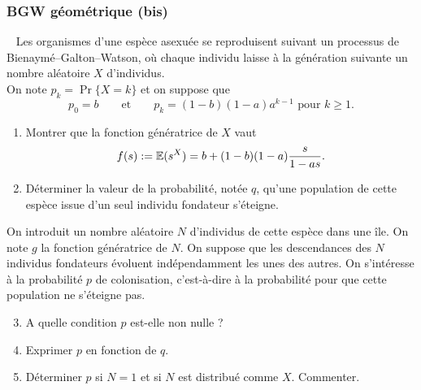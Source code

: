 \subsubsection{BGW géométrique (bis)}

\begin{exercise}[Probabilités] ~ \label{exam:Proba}
  Les organismes d’une espèce asexuée se reproduisent suivant un processus de Bienaymé–Galton–Watson, où chaque individu laisse à la génération suivante un nombre aléatoire $X$ d’individus. \\
  On note $p_k = \Pr\{X = k\}$ et on suppose que 
  $$
  p_0 = b
  \qquad \text{et} \qquad 
  p_k = (1 - b) (1 - a) a^{k-1} \text{ pour } k \geq 1.
  $$
  \begin{enumerate}
    \item Montrer que la fonction génératrice de $X$ vaut
    $$
    f(s) := \operatorname{\mathbb{E}}(s^X) = b + (1-b)(1-a) \frac{s}{1 - as}.
    $$
    \item Déterminer la valeur de la probabilité, notée $q$, qu'une population de cette espèce issue d’un seul individu fondateur s'éteigne.
  \end{enumerate}
  On introduit un nombre aléatoire $N$ d'individus de cette espèce dans une île. On note $g$ la fonction génératrice de $N$. On suppose que les descendances des $N$ individus fondateurs évoluent indépendamment les unes des autres. On s'intéresse à la probabilité $p$ de colonisation, c'est-à-dire à la probabilité pour que cette population ne s'éteigne pas.
  \begin{enumerate}
    \setcounter{enumi}{2}
    \item A quelle condition $p$ est-elle non nulle ?
    \item Exprimer $p$ en fonction de $q$. 
    \item Déterminer $p$ si $N = 1$ et si $N$ est distribué comme $X$. Commenter.
  \end{enumerate}
\end{exercise}

